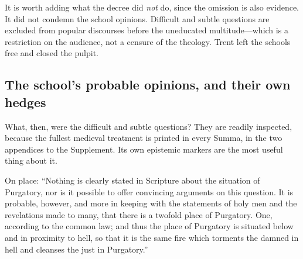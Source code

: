 It is worth adding what the decree did \emph{not} do, since the omission is also evidence. It did not condemn the school opinions. Difficult and subtle questions are excluded from popular discourses before the uneducated multitude---which is a restriction on the audience, not a censure of the theology. Trent left the schools free and closed the pulpit.

\subsection{The school's probable opinions, and their own hedges}

What, then, were the difficult and subtle questions? They are readily inspected, because the fullest medieval treatment is printed in every Summa, in the two appendices to the Supplement. Its own epistemic markers are the most useful thing about it.

On place: ``Nothing is clearly stated in Scripture about the situation of Purgatory, nor is it possible to offer convincing arguments on this question. It is probable, however, and more in keeping with the statements of holy men and the revelations made to many, that there is a twofold place of Purgatory. One, according to the common law; and thus the place of Purgatory is situated below and in proximity to hell, so that it is the same fire which torments the damned in hell and cleanses the just in Purgatory.''

